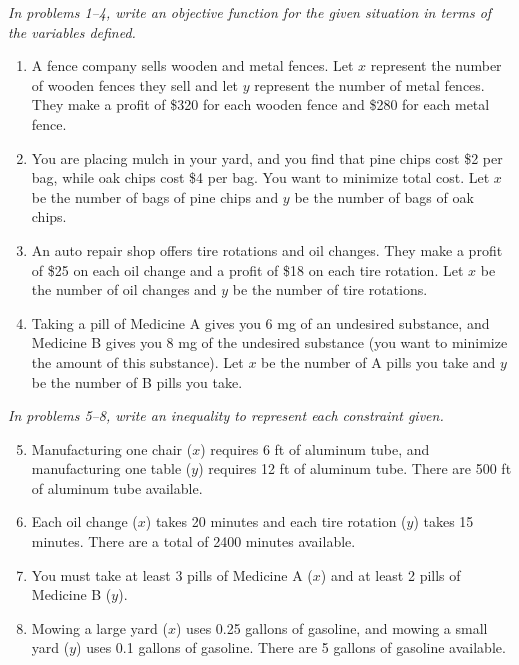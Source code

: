 \emph{In problems 1--4, write an objective function for the given situation in terms of the variables defined.}
\begin{enumerate}
\item A fence company sells wooden and metal fences.  Let $x$ represent the number of wooden fences they sell and let $y$ represent the number of metal fences.  They make a profit of \$320 for each wooden fence and \$280 for each metal fence. 

\item You are placing mulch in your yard, and you find that pine chips cost \$2 per bag, while oak chips cost \$4 per bag.  You want to minimize total cost.  Let $x$ be the number of bags of pine chips and $y$ be the number of bags of oak chips. 

\item An auto repair shop offers tire rotations and oil changes.  They make a profit of \$25 on each oil change and a profit of \$18 on each tire rotation.  Let $x$ be the number of oil changes and $y$ be the number of tire rotations. 

\item Taking a pill of Medicine A gives you 6 mg of an undesired substance, and Medicine B gives you 8 mg of the undesired substance (you want to minimize the amount of this substance).  Let $x$ be the number of A pills you take and $y$ be the number of B pills you take.
\end{enumerate}

\emph{In problems 5--8, write an inequality to represent each constraint given.}
\begin{enumerate}
\setcounter{enumi}{4}

\item Manufacturing one chair ($x$) requires 6 ft of aluminum tube, and manufacturing one table ($y$) requires 12 ft of aluminum tube.  There are 500 ft of aluminum tube available. 

\item Each oil change ($x$) takes 20 minutes and each tire rotation ($y$) takes 15 minutes.  There are a total of 2400 minutes available. 

\item You must take at least 3 pills of Medicine A ($x$) and at least 2 pills of Medicine B ($y$). 

\item Mowing a large yard ($x$) uses 0.25 gallons of gasoline, and mowing a small yard ($y$) uses 0.1 gallons of gasoline.  There are 5 gallons of gasoline available. 
\end{enumerate}
\vfill
\pagebreak

